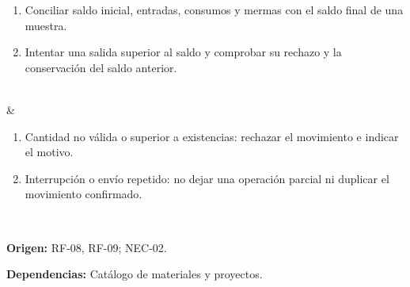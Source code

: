 \documentclass[12pt,letterpaper]{article}
\begin{document}
{\begin{enumerate}[nosep,leftmargin=*]
\item Conciliar saldo inicial, entradas, consumos y mermas con el saldo final de una muestra.
\item Intentar una salida superior al saldo y comprobar su rechazo y la conservación del saldo anterior.
\end{enumerate}\\\hline
{} & \begin{enumerate}[nosep,leftmargin=*]
\item Cantidad no válida o superior a existencias: rechazar el movimiento e indicar el motivo.
\item Interrupción o envío repetido: no dejar una operación parcial ni duplicar el movimiento confirmado.
\end{enumerate}\\\hline
}
{\textbf{Origen:} RF-08, RF-09; NEC-02.\par
\textbf{Dependencias:} Catálogo de materiales y proyectos.}
\end{document}
